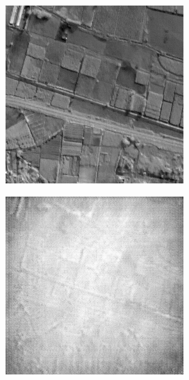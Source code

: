 \begin{figure}
    \centering
    \begin{subfigure}[b]{0.19\textwidth}
        \centering
        \includegraphics[width=\textwidth]{../figs/outputs/pan/71.png}
    \end{subfigure}
    \hfill
    \begin{subfigure}[b]{0.19\textwidth}
        \centering
        \includegraphics[width=\textwidth]{../figs/outputs/cycleGan/71.png}

\end{subfigure}
\end{figure}
